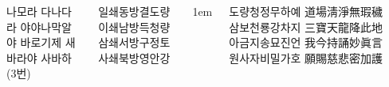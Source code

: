 \documentclass[20pt, a0paper ]{tikzposter}
\begin{document}
\begin{columns}
{\begin{LARGE}
나모라 다나다라 야야나막알야 바로기제 새바라야 사바하(3번)

				\end{LARGE}
			}




			{
				\begin{LARGE}

일쇄동방결도량  %
이쇄남방득청량 %
삼쇄서방구정토 %
사쇄북방영안강 %



				\end{LARGE}
			}



			{
					\setlength{\leftmargini}{4em}
					\setlength{\labelsep} {1em}
				\begin{LARGE}
					도량청정무하예  道場淸淨無瑕穢 
					삼보천룡강차지 三寶天龍降此地 
					아금지송묘진언 我今持誦妙眞言 
					원사자비밀가호 願賜慈悲密加護

				\end{LARGE}
			}






			{
				\begin{LARGE}


\end{LARGE}}
\end{columns}
\end{document}
